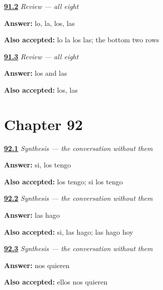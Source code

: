 \noindent\begin{minipage}[t]{\linewidth}
\raggedright
\hyperlink{review-ES-C45-repaso-ocho-quarter}{\textbf{91.2}} \emph{Review — all eight}\par
\small \textbf{Answer:} lo, la, los, las\par
\footnotesize \textbf{Also accepted:} lo la los las; the bottom two rows
\end{minipage}\par\medskip

\noindent\begin{minipage}[t]{\linewidth}
\raggedright
\hyperlink{review-ES-C45-repaso-ocho-free}{\textbf{91.3}} \emph{Review — all eight}\par
\small \textbf{Answer:} los and las\par
\footnotesize \textbf{Also accepted:} los, las
\end{minipage}\par\medskip

\section*{Chapter 92}

\noindent\begin{minipage}[t]{\linewidth}
\raggedright
\hyperlink{review-ES-C45-sintesis-sin-repetir-books}{\textbf{92.1}} \emph{Synthesis — the conversation without them}\par
\small \textbf{Answer:} si, los tengo\par
\footnotesize \textbf{Also accepted:} los tengo; si los tengo
\end{minipage}\par\medskip

\noindent\begin{minipage}[t]{\linewidth}
\raggedright
\hyperlink{review-ES-C45-sintesis-sin-repetir-meals}{\textbf{92.2}} \emph{Synthesis — the conversation without them}\par
\small \textbf{Answer:} las hago\par
\footnotesize \textbf{Also accepted:} si, las hago; las hago hoy
\end{minipage}\par\medskip

\noindent\begin{minipage}[t]{\linewidth}
\raggedright
\hyperlink{review-ES-C45-sintesis-sin-repetir-us}{\textbf{92.3}} \emph{Synthesis — the conversation without them}\par
\small \textbf{Answer:} nos quieren\par
\footnotesize \textbf{Also accepted:} ellos nos quieren
\end{minipage}\par\medskip

